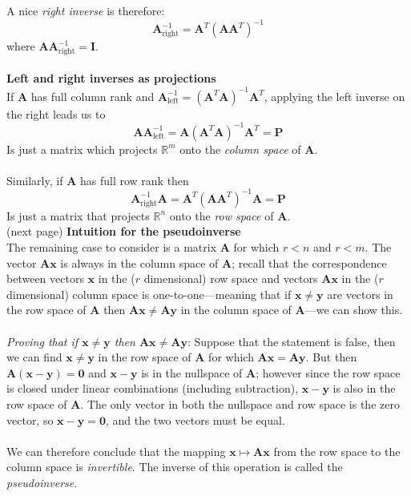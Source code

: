 \documentclass{report}
\begin{document}
A nice \textit{right inverse} is therefore:
\begin{equation*}
\bm A^{-1}_{\text{right}}=\bm A^T(\bm A\bm A^T)^{-1}
\end{equation*}
where $\bm A\bm A^{-1}_{\text{right}}=\bm I$.\\
\vspace{1mm}\\
\textbf{Left and right inverses as projections}\\
If $\bm A$ has full column rank and $\bm{A}^{-1}_{\text{left}}=(\bm A^T\bm A)^{-1}\bm A^T$, applying the left inverse on the right leads us to 
\begin{equation*}
\bm{AA}^{-1}_{\text{left}}=\bm A(\bm A^T\bm A)^{-1}\bm A^T=\bm P
\end{equation*}
Is just a matrix which projects $\mathbb{R}^m$ onto the \textit{column space} of $\bm A$.\\
\vspace{1mm}\\
Similarly, if $\bm A$ has full row rank then 
\begin{equation*}
\bm A^{-1}_{\text{right}}\bm A=\bm A^T(\bm A\bm A^T)^{-1}\bm A=\bm P
\end{equation*}
Is just a matrix that projects $\mathbb{R}^n$ onto the \textit{row space} of $\bm A$.\\
(next page)\newpage
\noindent\textbf{Intuition for the pseudoinverse}\\
The remaining case to consider is a matrix $\bm A$ for which $r<n$ and $r<m$. The vector $\bm{Ax}$ is always in the column space of $\bm A$; recall that the correspondence
between vectors $\bm x$ in the ($r$ dimensional) row space and vectors $\bm{Ax}$ in the ($r$ dimensional) column space is one-to-one---meaning that 
if $\bm x\neq \bm y$ are vectors in the row space of $\bm A$ then $\bm{Ax}\neq\bm{Ay}$ in the column space of $\bm A$---we can show this.\\
\vspace{1mm}\\
\textit{Proving that if $\bm x\neq\bm y$ then $\bm{Ax}\neq\bm{Ay}$}: Suppose that the statement is false, then
we can find $\bm x\neq \bm y$ in the row space of $\bm A$ for which $\bm{Ax}=\bm{Ay}$. But then $\bm{A}(\bm x-\bm y)=\bm 0$ and $\bm x-\bm y$ is in the 
nullspace of $\bm A$; however since the row space is closed under linear combinations (including subtraction), $\bm x-\bm y$ is also in the row space of $\bm A$. The only
vector in both the nullspace and row space is the zero vector, so $\bm x-\bm y=\bm 0$,
and the two vectors must be equal.\\
\vspace{1mm}\\
We can therefore conclude that the mapping $\bm x\mapsto\bm{Ax}$ from the row space to the column space is \textit{invertible}. The inverse of this operation is called the
\textit{pseudoinverse}.
\end{document}
